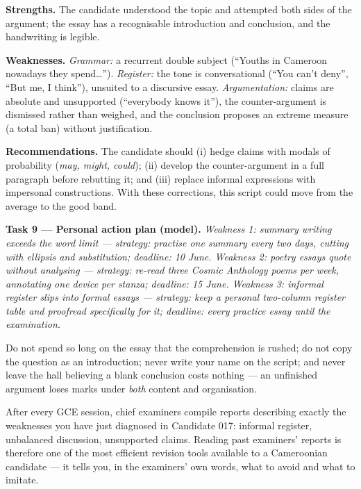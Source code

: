 \documentclass[11pt]{article}
\begin{document}
\begin{exemplebox}
\textbf{Strengths.} The candidate understood the topic and attempted both sides of the argument; the essay has a recognisable introduction and conclusion, and the handwriting is legible.

\textbf{Weaknesses.} \emph{Grammar:} a recurrent double subject (``Youths in Cameroon nowadays they spend\ldots''). \emph{Register:} the tone is conversational (``You can't deny'', ``But me, I think''), unsuited to a discursive essay. \emph{Argumentation:} claims are absolute and unsupported (``everybody knows it''), the counter-argument is dismissed rather than weighed, and the conclusion proposes an extreme measure (a total ban) without justification.

\textbf{Recommendations.} The candidate should (i) hedge claims with modals of probability (\emph{may, might, could}); (ii) develop the counter-argument in a full paragraph before rebutting it; and (iii) replace informal expressions with impersonal constructions. With these corrections, this script could move from the average to the good band.
\end{exemplebox}

\textbf{Task 9 — Personal action plan (model).} \emph{Weakness 1: summary writing exceeds the word limit — strategy: practise one summary every two days, cutting with ellipsis and substitution; deadline: 10 June. Weakness 2: poetry essays quote without analysing — strategy: re-read three Cosmic Anthology poems per week, annotating one device per stanza; deadline: 15 June. Weakness 3: informal register slips into formal essays — strategy: keep a personal two-column register table and proofread specifically for it; deadline: every practice essay until the examination.}

\begin{attention}
Do not spend so long on the essay that the comprehension is rushed; do not copy the question as an introduction; never write your name on the script; and never leave the hall believing a blank conclusion costs nothing — an unfinished argument loses marks under \emph{both} content and organisation.
\end{attention}

\begin{savaistu}
After every GCE session, chief examiners compile reports describing exactly the weaknesses you have just diagnosed in Candidate 017: informal register, unbalanced discussion, unsupported claims. Reading past examiners' reports is therefore one of the most efficient revision tools available to a Cameroonian candidate — it tells you, in the examiners' own words, what to avoid and what to imitate.
\end{savaistu}
\end{document}
